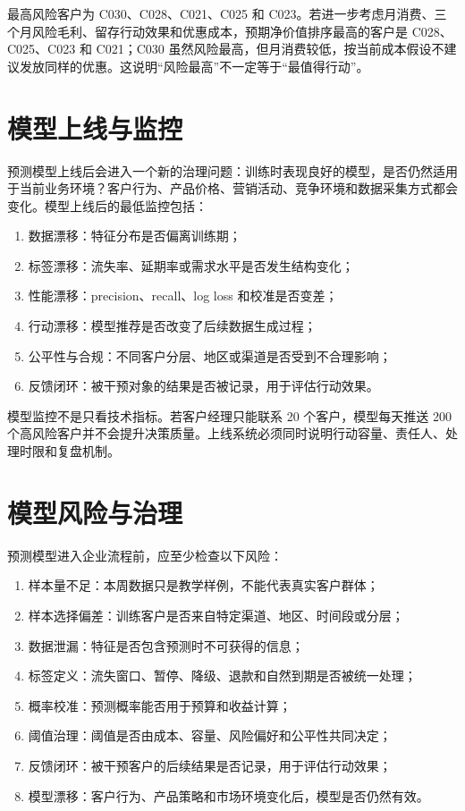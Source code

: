 \documentclass[UTF8,fontset=fandol,openany,zihao=-4]{ctexbook}
\begin{document}
最高风险客户为 C030、C028、C021、C025 和 C023。若进一步考虑月消费、三个月风险毛利、留存行动效果和优惠成本，预期净价值排序最高的客户是 C028、C025、C023 和 C021；C030 虽然风险最高，但月消费较低，按当前成本假设不建议发放同样的优惠。这说明“风险最高”不一定等于“最值得行动”。

\section{模型上线与监控}

预测模型上线后会进入一个新的治理问题：训练时表现良好的模型，是否仍然适用于当前业务环境？客户行为、产品价格、营销活动、竞争环境和数据采集方式都会变化。模型上线后的最低监控包括：
\begin{enumerate}
  \item 数据漂移：特征分布是否偏离训练期；
  \item 标签漂移：流失率、延期率或需求水平是否发生结构变化；
  \item 性能漂移：precision、recall、log loss 和校准是否变差；
  \item 行动漂移：模型推荐是否改变了后续数据生成过程；
  \item 公平性与合规：不同客户分层、地区或渠道是否受到不合理影响；
  \item 反馈闭环：被干预对象的结果是否被记录，用于评估行动效果。
\end{enumerate}

模型监控不是只看技术指标。若客户经理只能联系 20 个客户，模型每天推送 200 个高风险客户并不会提升决策质量。上线系统必须同时说明行动容量、责任人、处理时限和复盘机制。

\section{模型风险与治理}

预测模型进入企业流程前，应至少检查以下风险：
\begin{enumerate}
  \item 样本量不足：本周数据只是教学样例，不能代表真实客户群体；
  \item 样本选择偏差：训练客户是否来自特定渠道、地区、时间段或分层；
  \item 数据泄漏：特征是否包含预测时不可获得的信息；
  \item 标签定义：流失窗口、暂停、降级、退款和自然到期是否被统一处理；
  \item 概率校准：预测概率能否用于预算和收益计算；
  \item 阈值治理：阈值是否由成本、容量、风险偏好和公平性共同决定；
  \item 反馈闭环：被干预客户的后续结果是否记录，用于评估行动效果；
  \item 模型漂移：客户行为、产品策略和市场环境变化后，模型是否仍然有效。
\end{enumerate}
\end{document}
